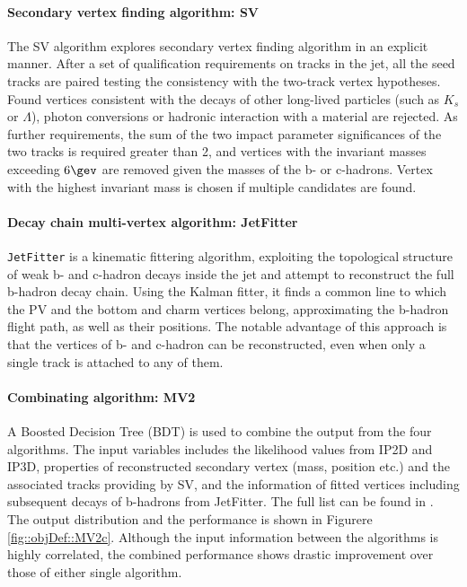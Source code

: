 \paragraph{Secondary vertex finding algorithm: SV}
The SV algorithm \cite{152_SV} explores secondary vertex finding algorithm in an explicit manner. 
After a set of qualification requirements on tracks in the jet, all the seed tracks are paired testing the consistency with the two-track vertex hypotheses. Found vertices consistent with the decays of other long-lived particles (such as $K_s$ or $\Lambda$), photon conversions or hadronic interaction with a material are rejected. As further requirements, the sum of the two impact parameter significances of the two tracks is required greater than 2, and vertices with the invariant masses exceeding $6 \gev$ are removed given the masses of the b- or c-hadrons. 
Vertex with the highest invariant mass is chosen if multiple candidates are found. %


\paragraph{Decay chain multi-vertex algorithm: JetFitter}
\texttt{JetFitter} \cite{153_JetFitter} is a kinematic fittering algorithm, exploiting the topological structure of weak b- and c-hadron decays inside the jet and attempt to reconstruct the full b-hadron decay chain. Using the Kalman fitter, it finds a common line to which the PV and the bottom and charm vertices belong, approximating the b-hadron flight path, as well as their positions. The notable advantage of this approach is that the vertices of b- and c-hadron can be reconstructed, even when only a single track is attached to any of them.

\paragraph{Combinating algorithm: MV2 }
A Boosted Decision Tree (BDT) is used to combine the output from the four algorithms.
The input variables includes
the likelihood values from IP2D and IP3D,
properties of reconstructed secondary vertex (mass, position etc.) and the associated tracks providing by SV,
and the information of fitted vertices including subsequent decays of b-hadrons from JetFitter.
The full list can be found in \cite{150_bTag_Run2_exp}. \\

The output distribution and the performance is shown in Figurere \ref{fig::objDef::MV2c}.
Although the input information between the algorithms is highly correlated, the combined performance shows drastic improvement over those of either single algorithm. \\

